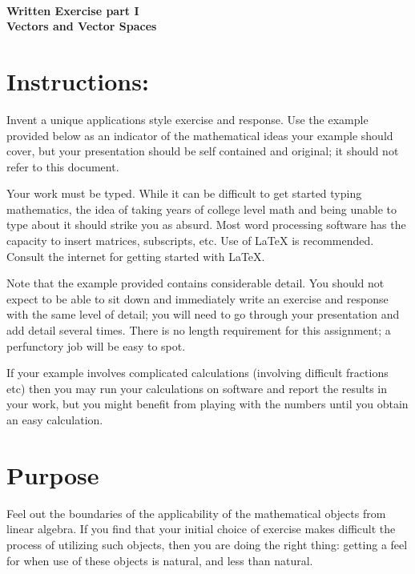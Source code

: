 \documentclass[12pt]{article}
\begin{document}
\thispagestyle{empty}
~
\vspace{-2cm}

\begin{center}
\vspace{-1.5cm}
{\Large{\bf  
Written Exercise part I\\
Vectors and Vector Spaces}
 }  \\[9mm]
\end{center}




\section{Instructions:} 
Invent a unique applications style exercise and response. 
Use the example provided below as an indicator of the mathematical ideas your example should cover, but your presentation should be self contained and original; it should not refer to this document. 

Your work must be typed. While it can be difficult to get started typing mathematics, the idea of taking years of college level math and being unable to type about it should strike you as absurd. Most word processing software has the capacity to insert matrices, subscripts, etc. Use of LaTeX is recommended. Consult the internet for getting started with LaTeX. 

Note that the example provided contains considerable detail. You should not expect to be able to sit down and immediately write an exercise and response with the same level of detail; you will need to go through your presentation and add detail several times. There is no length requirement for this assignment; a perfunctory job will be easy to spot. 

If your example involves complicated calculations (involving difficult fractions etc) then you may run your calculations on software and report the results in your work, but you might benefit from playing with the numbers until you obtain an easy calculation. 


\section{Purpose}

Feel out the boundaries of the applicability of the mathematical objects from linear algebra. If you find that your initial choice of exercise  makes difficult the process of utilizing such objects, then you are doing the right thing: getting a feel for when use of these objects is natural, and less than natural. 
\end{document}
